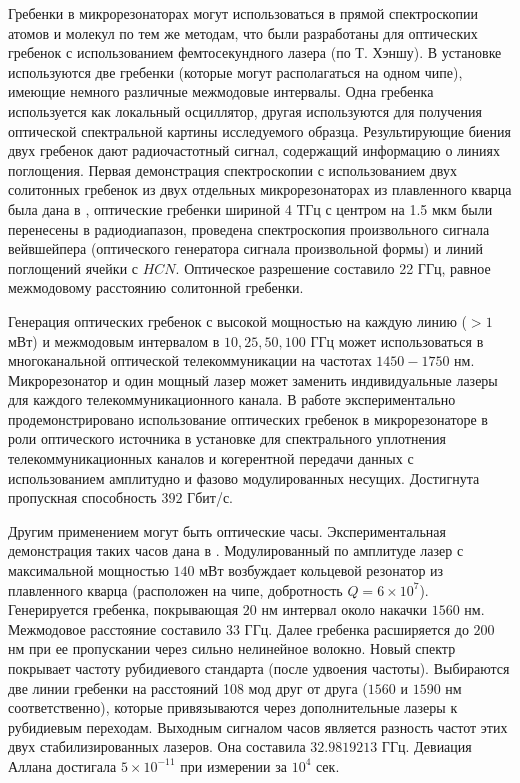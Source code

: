 Гребенки в микрорезонаторах могут использоваться в прямой спектроскопии атомов и молекул по тем же методам, что были разработаны для оптических гребенок с использованием фемтосекундного лазера (по Т. Хэншу). В установке используются две гребенки (которые могут располагаться на одном чипе), имеющие немного различные межмодовые интервалы. Одна гребенка используется как локальный осциллятор, другая используются для получения оптической спектральной картины исследуемого образца. Результирующие биения двух гребенок дают радиочастотный сигнал, содержащий информацию о линиях поглощения. Первая демонстрация спектроскопии с использованием двух солитонных гребенок из двух отдельных микрорезонаторах из плавленного кварца была дана в \cite{Suh2016}, оптические гребенки шириной 4 ТГц с центром на 1.5 мкм были перенесены в радиодиапазон, проведена спектроскопия произвольного сигнала вейвшейпера (оптического генератора сигнала произвольной формы) и линий поглощений ячейки с $HCN$. Оптическое разрешение составило 22 ГГц, равное межмодовому расстоянию солитонной гребенки.

Генерация оптических гребенок с высокой мощностью на каждую линию ($>1$ мВт) и межмодовым интервалом в $10,25,50,100$ ГГц может использоваться в многоканальной оптической телекоммуникации на частотах $1450-1750$ нм. Микрорезонатор и один мощный лазер может заменить индивидуальные лазеры для каждого телекоммуникационного канала. В работе \cite{Pfeifle2014} экспериментально продемонстрировано использование оптических гребенок в микрорезонаторе в роли оптического источника в установке для спектрального уплотнения телекоммуникационных каналов и когерентной передачи данных с использованием амплитудно и фазово модулированных несущих. Достигнута пропускная способность $392$ Гбит/с.

Другим применением могут быть оптические часы. Экспериментальная демонстрация таких часов дана в \cite{Papp2014}. Модулированный по амплитуде лазер с максимальной мощностью $140$ мВт возбуждает кольцевой резонатор из плавленного кварца (расположен на чипе, добротность $Q=6\times10^7$). Генерируется гребенка, покрывающая $20$ нм интервал около накачки $1560$ нм. Межмодовое расстояние составило $33$ ГГц. Далее гребенка расширяется до $200$ нм при ее пропускании через сильно нелинейное волокно. Новый спектр покрывает частоту рубидиевого стандарта (после удвоения частоты). Выбираются две линии гребенки на расстояний 108 мод друг от друга ($1560$ и $1590$ нм соответственно), которые привязываются через дополнительные лазеры к рубидиевым переходам. Выходным сигналом часов является разность частот этих двух стабилизированных лазеров. Она составила $32.9819213$ ГГц. Девиация Аллана достигала $5\times10^{-11}$ при измерении за $10^4$ сек.

